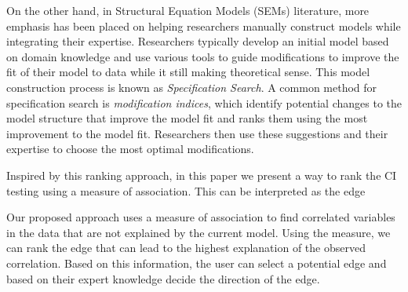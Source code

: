 \documentclass[letterpaper]{article} %
\begin{document}

On the other hand, in Structural Equation Models (SEMs) literature, more
emphasis has been placed on helping researchers manually construct models while
integrating their expertise. Researchers typically develop an initial model
based on domain knowledge and use various tools to guide modifications to
improve the fit of their model to data while it still making theoretical sense.
This model construction process is known as \emph{Specification Search}. A
common method for specification search is \emph{modification indices}, which
identify potential changes to the model structure that improve the model fit
and ranks them using the most improvement to the model fit. Researchers then
use these suggestions and their expertise to choose the most optimal
modifications.




Inspired by this ranking approach, in this paper we present a way to rank the CI 
testing using a measure of association. This can be interpreted as the edge 

Our proposed approach uses a measure of association to find correlated variables
in the data that are not explained by the current model. Using the measure, we 
can rank the edge that can lead to the highest explanation of the observed 
correlation. Based on this information, the user can select a potential edge
and based on their expert knowledge decide the direction of the edge.
\end{document}

